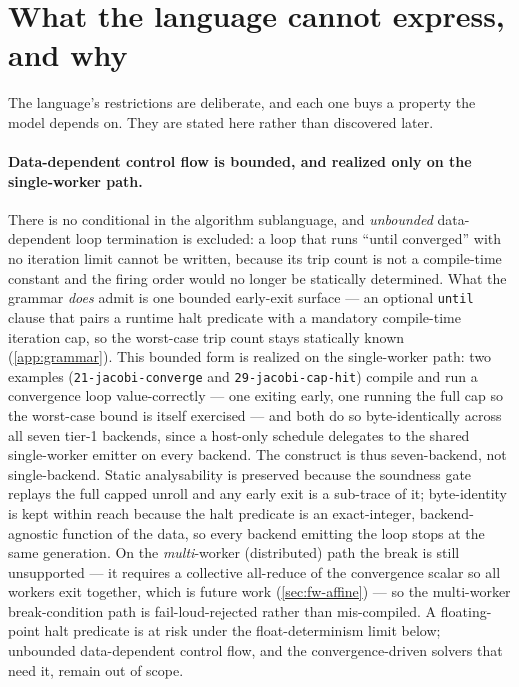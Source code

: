 \section{What the language cannot express, and why}\label{sec:lang-limits}

The language's restrictions are deliberate, and each one buys a property the
model depends on. They are stated here rather than discovered later.

\paragraph{Data-dependent control flow is bounded, and realized only on the
single-worker path.} There is no conditional in the algorithm sublanguage, and
\emph{unbounded} data-dependent loop termination is excluded: a loop that runs
``until converged'' with no iteration limit cannot be written, because its trip
count is not a compile-time constant and the firing order would no longer be
statically determined. What the grammar \emph{does} admit is one bounded early-exit
surface --- an optional \texttt{until} clause that pairs a runtime halt predicate
with a mandatory compile-time iteration cap, so the worst-case trip count stays
statically known (\cref{app:grammar}). This bounded form is realized on the
single-worker path: two examples (\texttt{21-jacobi-converge} and
\texttt{29-jacobi-cap-hit}) compile and run a convergence loop value-correctly ---
one exiting early, one running the full cap so the worst-case bound is itself
exercised --- and both do so byte-identically across all seven tier-1 backends, since a
host-only schedule delegates to the shared single-worker emitter on every backend. The
construct is thus seven-backend, not single-backend. Static analysability is preserved
because the soundness gate replays the
full capped unroll and any early exit is a sub-trace of it; byte-identity is kept
within reach because the halt predicate is an exact-integer, backend-agnostic
function of the data, so every backend emitting the loop stops at the same
generation. On the
\emph{multi}-worker (distributed) path the break is still unsupported --- it requires a
collective all-reduce of the convergence scalar so all workers exit together, which is
future work (\cref{sec:fw-affine}) --- so the multi-worker break-condition path is
fail-loud-rejected rather than mis-compiled. A floating-point halt predicate is at risk under the
float-determinism limit below; unbounded data-dependent control flow, and the
convergence-driven solvers that need it, remain out of scope.

